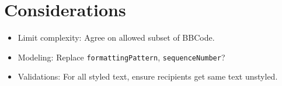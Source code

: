 \documentclass[11pt]{article}
\begin{document}
\section*{Considerations}
\label{sec:org64a958e}
\begin{itemize}
\item Limit complexity: Agree on allowed subset of BBCode.
\label{sec:org5423ada}
\item Modeling: Replace \texttt{formattingPattern}, \texttt{sequenceNumber}?
\label{sec:org770ca66}
\item Validations: For all styled text, ensure recipients get same text unstyled.
\label{sec:org13f18d4}
\end{itemize}
\end{document}
